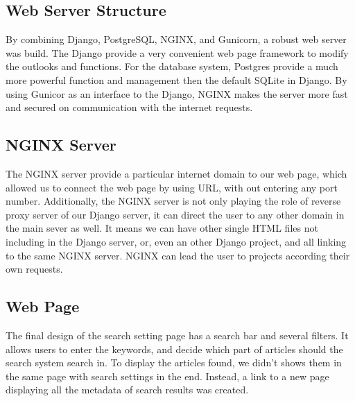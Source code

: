 \subsection{Web Server Structure}
By combining Django, PostgreSQL, NGINX, and Gunicorn, a robust web server was build.
The Django provide a very convenient web page framework to modify the outlooks and functions. 
For the database system, Postgres provide a much more powerful function and management then the default SQLite in Django.
By using Gunicor as an interface to the Django, NGINX makes the server more  fast and secured on communication with the internet requests.

\subsection{NGINX Server}
The NGINX server provide a particular internet domain to our web page,
which allowed us to connect the web page by using URL,
with out entering any port number. Additionally,
the NGINX server is not only playing the role of reverse proxy server of our Django server,
it can direct the user to any other domain in the main sever as well.
It means we can have other single HTML files not including in the Django server, or,
even an other Django project, and all linking to the same NGINX server.
NGINX can lead the user to projects according their own requests. 

\subsection{Web Page}
The final design of the search setting page has a search bar and several filters.
It allows users to enter the keywords, and decide which part of articles should the search system search in.
To display the articles found, we didn't shows them in the same page with search settings in the end. 
Instead, a link to a new page displaying all the metadata of search results was created.

